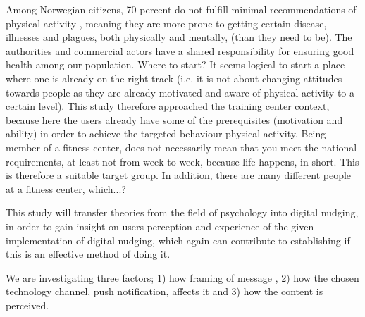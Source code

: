 Among Norwegian citizens, 70 percent do not fulfill minimal recommendations of physical activity \cite{folkehelseinstituttet_fysisk_nodate}, meaning they are more prone to getting certain disease, illnesses and plagues, both physically and mentally, (than they need to be). The authorities and commercial actors have a shared responsibility for ensuring good health among our population. Where to start? It seems logical to start a place where one is already on the right track (i.e. it is not about changing attitudes towards people as they are already motivated and aware of physical activity to a certain level). This study therefore approached the training center context, because here the users already have some of the prerequisites (motivation and ability) in order to achieve the targeted behaviour physical activity. Being member of a fitness center, does not necessarily mean that you meet the national requirements, at least not from week to week, because life happens, in short. This is therefore a suitable target group. In addition, there are many different people at a fitness center, which...?


This study will transfer theories from the field of psychology into digital nudging, in order to gain insight on users perception and experience of the given implementation of digital nudging, which again can contribute to establishing if this is an effective method of doing it. 

We are investigating three factors; 1) how framing of message , 2) how the chosen technology channel, push notification, affects it and 3) how the content is perceived.  



